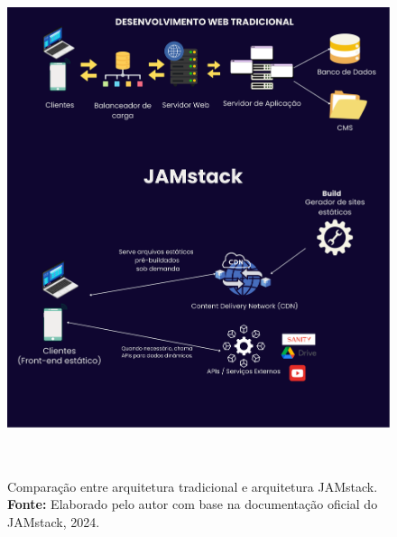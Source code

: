 {    \begin{figure}[H]
        \centering
        \includegraphics[height=15cm, keepaspectratio]{img/arquitetura/JAMstack explicação.png}
        \caption{ Comparação entre arquitetura tradicional e arquitetura JAMstack. \\
            \textbf{Fonte:} Elaborado pelo autor com base na documentação oficial do JAMstack, 2024.}
        \label{fig:jamStack Arquitetura}
    \end{figure}
    
}
